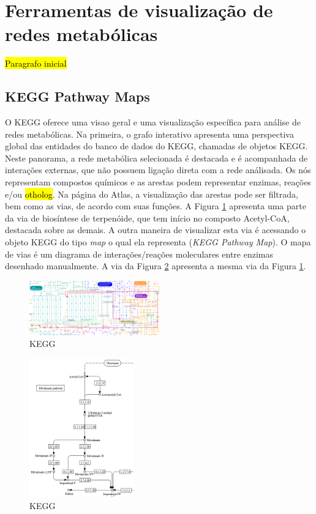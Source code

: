 \documentclass[conference]{IEEEtran}
\begin{document}
\section{Ferramentas de visualização de redes metabólicas}

\hl{Paragrafo inicial}

\subsection{KEGG Pathway Maps}

O KEGG oferece uma visao geral e uma visualização específica para análise de redes metabólicas. Na primeira, o grafo interativo apresenta uma perspectiva global das entidades do banco de dados do KEGG, chamadas de objetos KEGG. Neste panorama, a rede metabólica selecionada é destacada e é acompanhada de interações externas, que não possuem ligação direta com a rede análisada. Os nós representam compostos químicos e as arestas podem representar enzimas, reações e/ou \hl{otholog}. Na página do Atlas, a visualização das arestas pode ser filtrada, bem como as vias, de acordo com suas funções. A Figura \ref{terpenoid_meva_kegg} apresenta uma parte da via de biosíntese de terpenóide, que tem início no composto Acetyl-CoA, destacada sobre as demais. A outra maneira de visualizar esta via é acessando o objeto KEGG do tipo \textit{map} o qual ela representa (\textit{KEGG Pathway Map}). O mapa de vias é um diagrama de interações/reações moleculares entre enzimas desenhado manualmente. A via da Figura \ref{terpenoid_meva_kegg_solo} apresenta a mesma via da Figura \ref{terpenoid_meva_kegg}. \\

\begin{figure}[!t]
\centering
\includegraphics[width=0.5\textwidth]{terpenoid_meva_kegg.png}
\caption{KEGG}
\label{terpenoid_meva_kegg}
\end{figure}

\begin{figure}[!t]
\centering
\includegraphics[width=0.4\textwidth]{terpenoid_meva_kegg_solo.png}
\caption{KEGG}
\label{terpenoid_meva_kegg_solo}
\end{figure}
\end{document}
